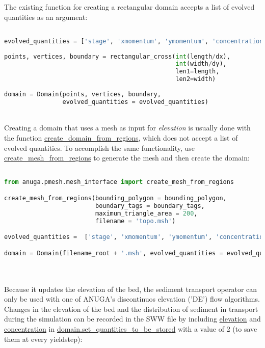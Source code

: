 \documentclass[10pt]{article}
\begin{document}
The existing function for creating a rectangular domain accepts a list of evolved quantities as an argument:

\begin{minipage}[c]{0.95\textwidth}
\begin{lstlisting}[language=Python, title=Creating a rectangular domain]

evolved_quantities = ['stage', 'xmomentum', 'ymomentum', 'concentration']
			  
points, vertices, boundary = rectangular_cross(int(length/dx),
									    	   int(width/dy),
									    	   len1=length,
									    	   len2=width)
                                                  	
domain = Domain(points, vertices, boundary,
				evolved_quantities = evolved_quantities)

\end{lstlisting}
\end{minipage}
\ \\

Creating a domain that uses a mesh as input for \textit{elevation} is usually done with the function \url{create_domain_from_regions}, which does not accept a list of evolved quantities. To accomplish the same functionality, use \url{create_mesh_from_regions} to generate the mesh and then create the domain:

\begin{minipage}[c]{0.95\textwidth}
\begin{lstlisting}[language=Python, title=Creating a domain from a mesh file]

from anuga.pmesh.mesh_interface import create_mesh_from_regions

create_mesh_from_regions(bounding_polygon = bounding_polygon,
                         boundary_tags = boundary_tags,
                         maximum_triangle_area = 200,
                         filename = 'topo.msh')

evolved_quantities =  ['stage', 'xmomentum', 'ymomentum', 'concentration']

domain = Domain(filename_root + '.msh', evolved_quantities = evolved_quantities)


\end{lstlisting}
\end{minipage}
\ \\ \ \\

Because it updates the elevation of the bed, the sediment transport operator can only be used with one of ANUGA's discontinuos elevation ('DE') flow algorithms. Changes in the elevation of the bed and the distribution of sediment in transport during the simulation can be recorded in the SWW file by including \url{elevation} and \url{concentration} in \url{domain.set_quantities_to_be_stored} with a value of 2 (to save them at every yieldstep):
\end{document}
